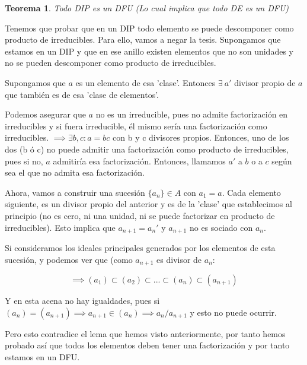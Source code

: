 \documentclass[11pt, a4paper, titlepage]{article}
\makeatletter
\renewenvironment{proof}[1][\proofname] {\vspace{-15pt}\par\pushQED{\qed}\normalfont\topsep6\p@\@plus6\p@\relax\trivlist\item[\hskip\labelsep\it#1\@addpunct{.}]\ignorespaces}{\popQED\endtrivlist\@endpefalse}
\theoremstyle{theorem-style}
\newtheorem*{nth}{Teorema}
\theoremstyle{definition-style}
\theoremstyle{remark-style}
\theoremstyle{example-style}
\makeatother
\begin{document}
\begin{nth}
	Todo DIP es un DFU (Lo cual implica que todo DE es un DFU)
\end{nth}
\begin{proof}
	Tenemos que probar que en un DIP todo elemento se puede descomponer como producto de irreducibles. Para ello, vamos a negar la tesis. Supongamos que estamos en un DIP y que en ese anillo existen elementos que no son unidades y no se pueden descomponer como producto de irreducibles.
	
	Supongamos que $a$ es un elemento de esa 'clase'. Entonces $\exists  \ a'$ divisor propio de $a$ que también es de esa 'clase de elementos'.
	
	Podemos asegurar que $a$ no es un irreducible, pues no admite factorización en irreducibles y si fuera irreducible, él mismo sería una factorización como irreducibles. $\implies \exists b,c : a = bc$ con b y c divisores propios. Entonces, uno de los dos (b ó c) no puede admitir una factorización como producto de irreducibles, pues si no, $a$ admitiría esa factorización. Entonces, llamamos $a'$ a $b$ o a $c$ según sea el que no admita esa factorización.
	
	Ahora, vamos a construir una sucesión $\{a_n\} \in A$ con $a_1 = a $. Cada elemento siguiente, es un divisor propio del anterior y es de la 'clase' que establecimos al principio (no es cero, ni una unidad, ni se puede factorizar en producto de irreducibles). Esto implica que $a_{n+1} = a_n'$ y $a_{n+1}$ no es sociado con $a_n$.
	
	Si consideramos los ideales principales generados por los elementos de esta sucesión, y podemos ver que (como $a_{n+1}$ es divisor de $a_n$:
	
	\[
	\implies (a_1) \subset (a_2) \subset ... \subset (a_n) \subset (a_{n+1})	\]
	
	Y en esta acena no hay igualdades, pues si $(a_n) = (a_{n+1}) \implies a_{n+1} \in (a_n) \implies a_n/ a_{n+1}$ y esto no puede ocurrir.
	
	Pero esto contradice el lema que hemos visto anteriormente, por tanto hemos probado así que todos los elementos deben tener una factorización y por tanto estamos en un DFU.
\end{proof}
\end{document}
